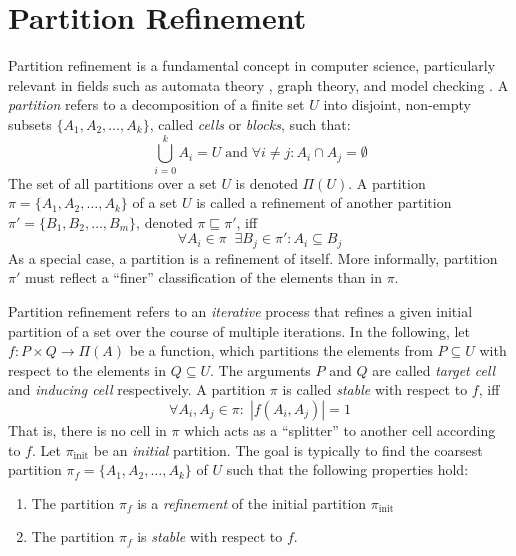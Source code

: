 	\section{Partition Refinement}
	\label{chap:prelims:partitionref}
		Partition refinement is a fundamental concept in computer science, particularly relevant in fields such as automata theory \cite{hopcroftLogALGORITHMMINIMIZING1971a}, graph theory, and model checking \cite{baierPrinciplesModelChecking2008}.
		A \textit{partition} refers to a decomposition of a finite set $U$ into disjoint, non-empty subsets $\{ A_1, A_2, \ldots, A_k \}$, called \textit{cells} or \textit{blocks}, such that:
		\begin{equation*}
			\bigcup^k_{i=0} A_i = U \; \mathrm{and} \; \forall i \neq j: A_i \cap A_j = \emptyset
		\end{equation*}
		The set of all partitions over a set $U$ is denoted $\Pi(U)$. A partition $\pi = \{ A_1, A_2, \ldots, A_k \}$ of a set $U$ is called a refinement of another partition $\pi' = \{ B_1, B_2, \ldots, B_m \}$, denoted $\pi \sqsubseteq \pi'$, iff
		\begin{equation*}
			\forall A_i \in \pi \;\; \exists B_j \in \pi' : A_i \subseteq B_j
		\end{equation*} 
		As a special case, a partition is a refinement of itself.
		More informally, partition $\pi'$ must reflect a \enquote{finer} classification of the elements than in $\pi$. 
		
		Partition refinement refers to an \textit{iterative} process that refines a given initial partition of a set over the course of multiple iterations.
		In the following, let $f: P \times Q \rightarrow \Pi(A)$ be a function, which partitions the elements from $P \subseteq U$ with respect to the elements in $Q \subseteq U$. The arguments $P$ and $Q$ are called \textit{target cell} and \textit{inducing cell} respectively.
		A partition $\pi$ is called \textit{stable} with respect to $f$, iff
		\begin{equation*}
			\forall A_i, A_j \in \pi: \; |f(A_i, A_j)| = 1
		\end{equation*}
		That is, there is no cell in $\pi$ which acts as a \enquote{splitter} to another cell according to $f$.
		Let $\pi_{\mathrm{init}}$ be an \textit{initial} partition. The goal is typically to find the coarsest partition $\pi_f = \{ A_1, A_2, \ldots, A_k \}$ of $U$ such that the following properties hold:
		
		\begin{enumerate}
			\item The partition $\pi_f$ is a \textit{refinement} of the initial partition $\pi_{\mathrm{init}}$
			\item The partition $\pi_f$ is \textit{stable} with respect to $f$.
		\end{enumerate}
		
